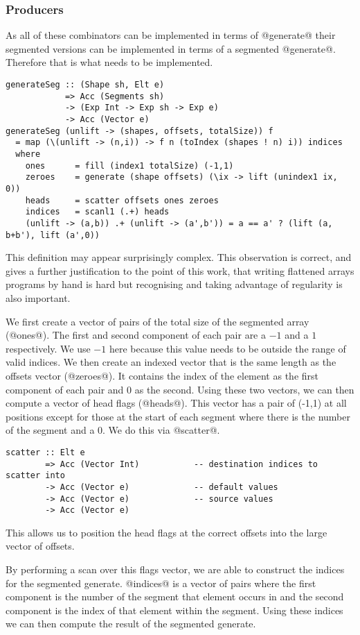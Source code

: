\subsubsection{Producers}
As all of these combinators can be implemented in terms of @generate@ their segmented versions can be implemented in terms of a segmented @generate@. Therefore that is what needs to be implemented.
%
\begin{lstlisting}
generateSeg :: (Shape sh, Elt e)
            => Acc (Segments sh)
            -> (Exp Int -> Exp sh -> Exp e)
            -> Acc (Vector e)
generateSeg (unlift -> (shapes, offsets, totalSize)) f
  = map (\(unlift -> (n,i)) -> f n (toIndex (shapes ! n) i)) indices
  where
    ones      = fill (index1 totalSize) (-1,1)
    zeroes    = generate (shape offsets) (\ix -> lift (unindex1 ix, 0))
    heads     = scatter offsets ones zeroes
    indices   = scanl1 (.+) heads
    (unlift -> (a,b)) .+ (unlift -> (a',b')) = a == a' ? (lift (a, b+b'), lift (a',0))
\end{lstlisting}
%
This definition may appear surprisingly complex. This observation is correct, and gives a further justification to the point of this work, that writing flattened arrays programs by hand is hard but recognising and taking advantage of regularity is also important.

We first create a vector of pairs of the total size of the segmented array (@ones@). The first and second component of each pair are a $-1$ and a $1$ respectively. We use $-1$ here because this value needs to be outside the range of valid indices. We then create an indexed vector that is the same length as the offsets vector (@zeroes@). It contains the index of the element as the first component of each pair and 0 as the second. Using these two vectors, we can then compute a vector of head flags (@heads@). This vector has a pair of (-1,1) at all positions except for those at the start of each segment where there is the number of the segment and a 0. We do this via @scatter@.
%
\begin{lstlisting}
scatter :: Elt e
        => Acc (Vector Int)           -- destination indices to scatter into
        -> Acc (Vector e)             -- default values
        -> Acc (Vector e)             -- source values
        -> Acc (Vector e)
\end{lstlisting}
%
This allows us to position the head flags at the correct offsets into the large vector of offsets.

By performing a scan over this flags vector, we are able to construct the indices for the segmented generate. @indices@ is a vector of pairs where the first component is the number of the segment that element occurs in and the second component is the index of that element within the segment. Using these indices we can then compute the result of the segmented generate.

